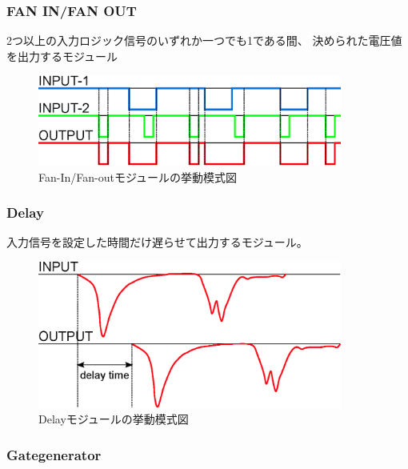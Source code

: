 \documentclass{jarticle}
\begin{document}
   \subsubsection*{FAN IN/FAN OUT}
	  
	  2つ以上の入力ロジック信号のいずれか一つでも1である間、
	  決められた電圧値を出力するモジュール
	  
	  \begin{figure}[H]
	   \begin{center}
	    \includegraphics[width = 100mm]{./picture/FaninFanout.eps}
	   \end{center}
	   \caption{Fan-In/Fan-outモジュールの挙動模式図}
	   \label{Fig:FaninFanout}
	  \end{figure}
	  
   \subsubsection*{Delay}
    	  
    	  入力信号を設定した時間だけ遅らせて出力するモジュール。
    	  
	  \begin{figure}[H]
	   \begin{center}
	    \includegraphics[width = 100mm]{./picture/Delay.eps}
	   \end{center}
	   \caption{Delayモジュールの挙動模式図}
	   \label{Fig:Delay}
	  \end{figure}
	  
	  
   \subsubsection*{Gategenerator}
   	  
\end{document}
